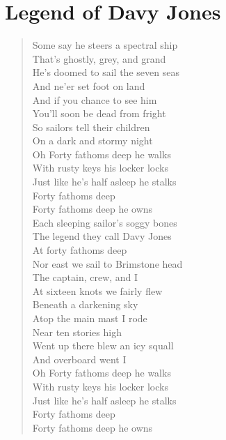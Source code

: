 \documentclass[11pt]{article}
\begin{document}
\section{Legend of Davy Jones}
\label{sec:orgf52c520}
\begin{verse}
Some say he steers a spectral ship\\
That's ghostly, grey, and grand\\
He's doomed to sail the seven seas\\
And ne'er set foot on land\\
\vspace*{1em}
And if you chance to see him\\
You'll soon be dead from fright\\
So sailors tell their children\\
On a dark and stormy night\\
\vspace*{1em}
Oh Forty fathoms deep he walks\\
With rusty keys his locker locks\\
Just like he's half asleep he stalks\\
Forty fathoms deep\\
Forty fathoms deep he owns\\
Each sleeping sailor's soggy bones\\
The legend they call Davy Jones\\
At forty fathoms deep\\
\vspace*{1em}
Nor east we sail to Brimstone head\\
The captain, crew, and I\\
At sixteen knots we fairly flew\\
Beneath a darkening sky\\
\vspace*{1em}
Atop the main mast I rode\\
Near ten stories high\\
Went up there blew an icy squall\\
And overboard went I\\
\vspace*{1em}
Oh Forty fathoms deep he walks\\
With rusty keys his locker locks\\
Just like he's half asleep he stalks\\
Forty fathoms deep\\
\vspace*{1em}
Forty fathoms deep he owns\\

\end{verse}
\end{document}

